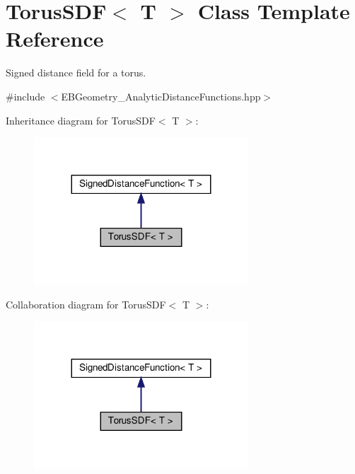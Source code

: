 \hypertarget{classTorusSDF}{}\section{Torus\+S\+DF$<$ T $>$ Class Template Reference}
\label{classTorusSDF}


Signed distance field for a torus.  




{\ttfamily \#include $<$E\+B\+Geometry\+\_\+\+Analytic\+Distance\+Functions.\+hpp$>$}



Inheritance diagram for Torus\+S\+DF$<$ T $>$\+:
\nopagebreak
\begin{figure}[H]
\begin{center}
\leavevmode
\includegraphics[width=227pt]{classTorusSDF__inherit__graph}
\end{center}
\end{figure}


Collaboration diagram for Torus\+S\+DF$<$ T $>$\+:
\nopagebreak
\begin{figure}[H]
\begin{center}
\leavevmode
\includegraphics[width=227pt]{classTorusSDF__coll__graph}
\end{center}
\end{figure}
